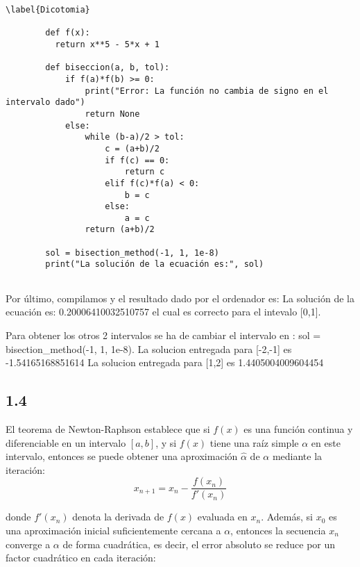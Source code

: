 \documentclass[12pt]{article}
\begin{document}
      \begin{lstlisting}\label{Dicotomia}

        def f(x):
          return x**5 - 5*x + 1

        def biseccion(a, b, tol):
            if f(a)*f(b) >= 0:
                print("Error: La función no cambia de signo en el intervalo dado")
                return None
            else:
                while (b-a)/2 > tol:
                    c = (a+b)/2
                    if f(c) == 0:
                        return c
                    elif f(c)*f(a) < 0:
                        b = c
                    else:
                        a = c
                return (a+b)/2

        sol = bisection_method(-1, 1, 1e-8)
        print("La solución de la ecuación es:", sol)
      
      \end{lstlisting}

      Por último, compilamos y el resultado dado por el ordenador es:
      La solución de la ecuación es: 0.20006410032510757 el cual es correcto para el intevalo [0,1].

      Para obtener los otros 2 intervalos se ha de cambiar el intervalo en : sol = bisection_method(-1, 1, 1e-8).
      La solucion entregada para [-2,-1] es -1.54165168851614
      La solucion entregada para [1,2] es 1.4405004009604454

      \subsection{1.4}

      El teorema de Newton-Raphson establece que si $f(x)$ es una función continua y diferenciable en un intervalo $[a,b]$, y si $f(x)$ tiene una raíz simple $\alpha$ en este intervalo, entonces se puede obtener una aproximación $\hat{\alpha}$ de $\alpha$ mediante la iteración:
      \begin{equation}\label{Newton_a}
        
        x_{n+1} = x_{n}-\frac{f(x_n)}{f'(x_n)}

      \end{equation}

      donde $f'(x_n)$ denota la derivada de $f(x)$ evaluada en $x_n$. Además, si $x_0$ es una aproximación inicial suficientemente cercana a $\alpha$, entonces la secuencia ${x_n}$ converge a $\alpha$ de forma cuadrática, es decir, el error absoluto se reduce por un factor cuadrático en cada iteración:
\end{document}
